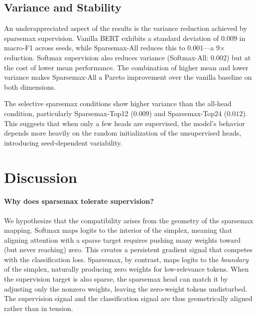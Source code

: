 \documentclass{article}
\begin{document}
\subsection{Variance and Stability}

An underappreciated aspect of the results is the variance reduction achieved
by sparsemax supervision. Vanilla BERT exhibits a standard deviation of
$0.009$ in macro-F1 across seeds, while Sparsemax-All reduces this to
$0.001$---a 9$\times$ reduction. Softmax supervision also reduces variance
(Softmax-All: $0.002$) but at the cost of lower mean performance. The
combination of higher mean and lower variance makes Sparsemax-All a
Pareto improvement over the vanilla baseline on both dimensions.

The selective sparsemax conditions show higher variance than the all-head
condition, particularly Sparsemax-Top12 ($0.009$) and Sparsemax-Top24
($0.012$). This suggests that when only a few heads are supervised, the
model's behavior depends more heavily on the random initialization of
the unsupervised heads, introducing seed-dependent variability.

\section{Discussion}
\label{sec:discussion}

\paragraph{Why does sparsemax tolerate supervision?}
We hypothesize that the compatibility arises from the geometry of the
sparsemax mapping. Softmax maps logits to the interior of the simplex,
meaning that aligning attention with a sparse target requires pushing many
weights toward (but never reaching) zero. This creates a persistent gradient
signal that competes with the classification loss. Sparsemax, by contrast,
maps logits to the \emph{boundary} of the simplex, naturally producing
zero weights for low-relevance tokens. When the supervision target is also
sparse, the sparsemax head can match it by adjusting only the nonzero
weights, leaving the zero-weight tokens undisturbed. The supervision signal
and the classification signal are thus geometrically aligned rather than
in tension.
\end{document}
